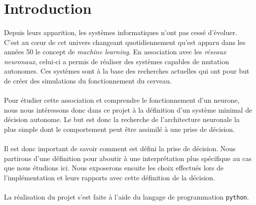 \section*{Introduction}

\paragraph{}
Depuis leurs apparition, les systèmes informatiques n'ont pas cessé d'évoluer.
C'est au cœur de cet univers changeant quotidiennement qu'est apparu dans les
années 50 le concept de {\em machine learning}. En association avec les
{\em réseaux neuronaux}, celui-ci a permis de réaliser des systèmes capables
de mutation autonomes. Ces systèmes sont à la base des recherches actuelles
qui ont pour but de créer des simulations du fonctionnement du cerveau.

\paragraph{}
Pour étudier cette association et comprendre le fonctionnement d'un neurone,
nous nous intéressons donc dans ce projet à la définition d'un système minimal
de décision autonome.
Le but est donc la recherche de l'architecture neuronale la plus simple dont
le comportement peut être assimilé à une prise de décision.

\paragraph{}
Il est donc important de savoir comment est défini la prise de décision. Nous
partirons d'une définition pour aboutir à une interprétation plus spécifique au
cas que nous étudions ici.
Nous exposerons ensuite les choix effectués lors de l'implémentation et leurs
rapports avec cette définition de la décision.

\paragraph{}
La réalisation du projet s'est faite à l'aide du langage de programmation
\verb!python!.


